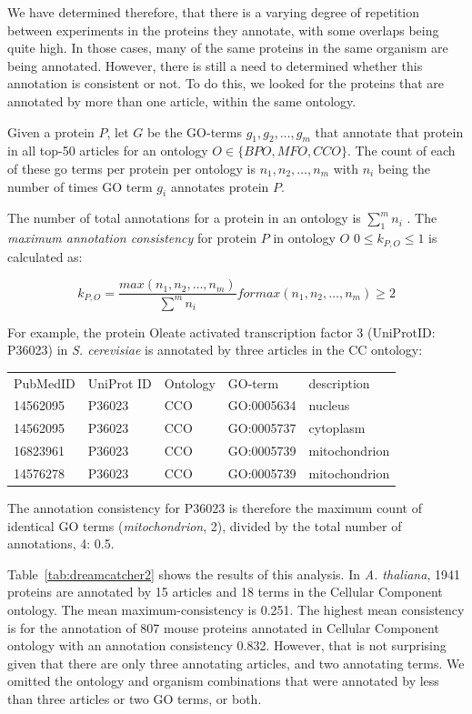 \documentclass[12pt]{article}
\begin{document}
We have determined therefore, that there is a varying degree of repetition between
experiments in the proteins they annotate, with some overlaps being quite high. In those
cases, many of the same proteins in the same organism are being annotated. However, there
is still a need to determined whether this annotation is consistent or not. To do this, we
looked for the proteins that are annotated by more than one article, within the same
ontology.

Given a protein $P$, let $G$ be the GO-terms $g_1,g_2,\dots,g_m$ that annotate that protein
in all top-50 articles for an ontology $O \in \{BPO,MFO,CCO\}$. The count of each of these
go terms per protein per ontology is $n_1,n_2,\dots,n_m$ with $n_i$ being the number of
times GO term $g_i$ annotates protein $P$.

The number of total annotations for a protein in an ontology is $\sum_1^m n_i$ . The
\textit{maximum annotation consistency} for protein $P$ in ontology $O$ $0 \leq k_{P,O}
\leq 1$ is calculated as:

\[
k_{P,O} = \frac{max(n_1,n_2,\dots,n_m)}{\sum^m n_i} for max(n_1,n_2,\dots,n_m) \geq 2
\]


For example, the protein Oleate activated transcription factor 3 (UniProtID: P36023) in \textit{S.
cerevisiae} is annotated by three articles in the CC ontology:

\begin{table}
\begin{tabular}{l l l l l}
PubMedID  &  UniProt ID& Ontology & GO-term & description \\
14562095  &  P36023    & CCO & GO:0005634  &   nucleus \\
14562095  &  P36023    & CCO  &  GO:0005737 &  cytoplasm \\
16823961  &  P36023    & CCO  & GO:0005739  &    mitochondrion \\
14576278  &  P36023    & CCO  & GO:0005739  &    mitochondrion \\
\end{tabular}
\end{table}

The annotation consistency for P36023 is therefore the maximum count of identical GO terms
(\textit{mitochondrion}, 2), divided by the total number of annotations, 4: 0.5.

Table~\ref{tab:dreamcatcher2} shows the results of this analysis. In \textit{A. thaliana},
1941 proteins are annotated by 15 articles and 18 terms in the Cellular Component ontology.
The mean maximum-consistency is 0.251. The highest mean consistency is for the annotation
of 807 mouse proteins annotated in Cellular Component ontology with an annotation
consistency 0.832. However, that is not surprising given that there are only three
annotating articles, and two annotating terms. We omitted the ontology and organism
combinations that were annotated by less than three articles or two GO terms, or both.
\end{document}
